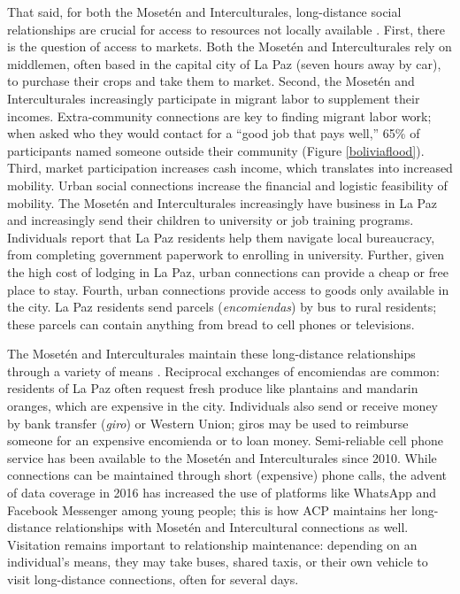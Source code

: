 \documentclass[bibauthoryear]{aa}
\begin{document}
That said, for both the Moset\'en and Interculturales, long-distance social relationships are crucial for access to resources not locally available \citep{pisorjones2020}. First, there is the question of access to markets. Both the Moset\'en and Interculturales rely on middlemen, often based in the capital city of La Paz (seven hours away by car), to purchase their crops and take them to market. Second, the Moset\'en and Interculturales increasingly participate in migrant labor to supplement their incomes. Extra-community connections are key to finding migrant labor work; when asked who they would contact for a ``good job that pays well,'' 65\% of participants named someone outside their community (Figure \ref{boliviaflood}). Third, market participation increases cash income, which translates into increased mobility. Urban social connections increase the financial and logistic feasibility of mobility. The Moset\'en and Interculturales increasingly have business in La Paz and increasingly send their children to university or job training programs. Individuals report that La Paz residents help them navigate local bureaucracy, from completing government paperwork to enrolling in university. Further, given the high cost of lodging in La Paz, urban connections can provide a cheap or free place to stay. Fourth, urban connections provide access to goods only available in the city. La Paz residents send parcels (\textit{encomiendas}) by bus to rural residents; these parcels can contain anything from bread to cell phones or televisions.

	The Moset\'en and Interculturales maintain these long-distance relationships through a variety of means \citep{pisorjones2020}. Reciprocal exchanges of encomiendas are common: residents of La Paz often request fresh produce like plantains and mandarin oranges, which are expensive in the city. Individuals also send or receive money by bank transfer (\textit{giro}) or Western Union; giros may be used to reimburse someone for an expensive encomienda or to loan money. Semi-reliable cell phone service has been available to the Moset\'en and Interculturales since 2010. While connections can be maintained through short (expensive) phone calls, the advent of data coverage in 2016 has increased the use of platforms like WhatsApp and Facebook Messenger among young people; this is how ACP maintains her long-distance relationships with Moset\'en and Intercultural connections as well. Visitation remains important to relationship maintenance: depending on an individual's means, they may take buses, shared taxis, or their own vehicle to visit long-distance connections, often for several days.
	
\end{document}
